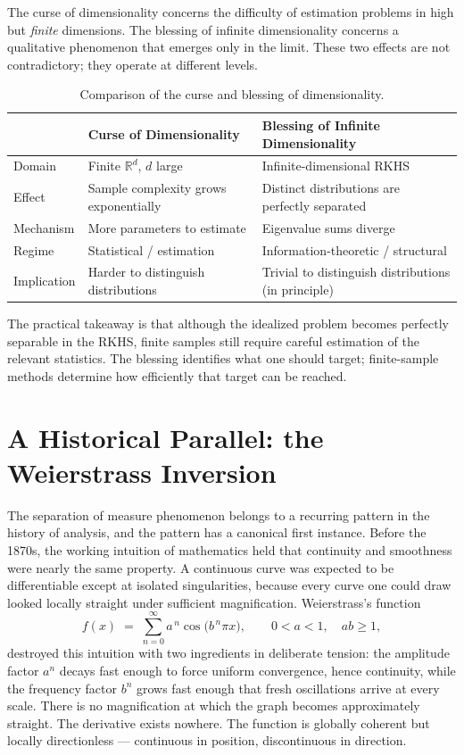 \documentclass[12pt, oneside]{book}
\theoremstyle{plain}
\theoremstyle{definition}
\newcommand{\R}{\mathbb{R}}
\begin{document}
The curse of dimensionality concerns the difficulty of estimation problems in high but \emph{finite} dimensions. The blessing of infinite dimensionality concerns a qualitative phenomenon that emerges only in the limit. These two effects are not contradictory; they operate at different levels.

\begin{table}[h]
\centering
\begin{tabular}{p{3.8cm} p{4.2cm} p{4.2cm}}
\toprule
& \textbf{Curse of Dimensionality} & \textbf{Blessing of Infinite Dimensionality} \\
\midrule
Domain & Finite $\R^d$, $d$ large & Infinite-dimensional RKHS \\
Effect & Sample complexity grows exponentially & Distinct distributions are perfectly separated \\
Mechanism & More parameters to estimate & Eigenvalue sums diverge \\
Regime & Statistical / estimation & Information-theoretic / structural \\
Implication & Harder to distinguish distributions & Trivial to distinguish distributions (in principle) \\
\bottomrule
\end{tabular}
\caption{Comparison of the curse and blessing of dimensionality.}
\end{table}

The practical takeaway is that although the idealized problem becomes perfectly separable in the RKHS, finite samples still require careful estimation of the relevant statistics. The blessing identifies what one should target; finite-sample methods determine how efficiently that target can be reached.

\section{A Historical Parallel: the Weierstrass Inversion}

The separation of measure phenomenon belongs to a recurring pattern in
the history of analysis, and the pattern has a canonical first
instance. Before the 1870s, the working intuition of mathematics held
that continuity and smoothness were nearly the same property. A
continuous curve was expected to be differentiable except at isolated
singularities, because every curve one could draw looked locally
straight under sufficient magnification. Weierstrass's function
\begin{equation}
f(x) \;=\; \sum_{n=0}^{\infty} a^{\,n} \cos\!\bigl(b^{\,n}\pi x\bigr),
\qquad 0 < a < 1, \quad ab \ge 1,
\end{equation}
destroyed this intuition with two ingredients in deliberate tension:
the amplitude factor $a^n$ decays fast enough to force uniform
convergence, hence continuity, while the frequency factor $b^n$ grows
fast enough that fresh oscillations arrive at every scale. There is no
magnification at which the graph becomes approximately straight. The
derivative exists nowhere. The function is globally coherent but
locally directionless --- continuous in position, discontinuous in
direction.
\end{document}
